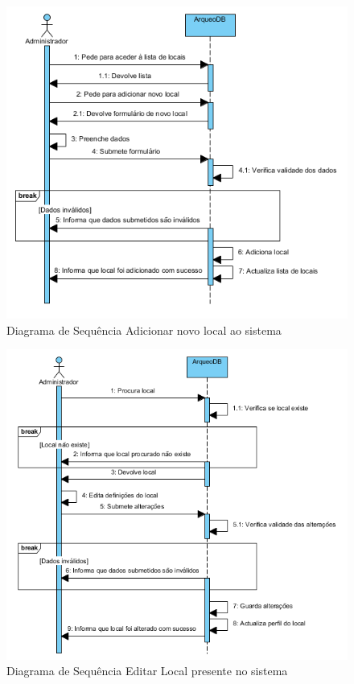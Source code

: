 \documentclass[12pt,a4paper]{article}
\begin{document}
\begin{figure}[h!]
\centering
\includegraphics[scale=1]{sequencia/A_adicionarlocal}
\caption{Diagrama de Sequência Adicionar novo local ao sistema} 
\end{figure}  

\begin{figure}[h!]
\centering
\includegraphics[scale=1]{sequencia/A_editarlocal}
\caption{Diagrama de Sequência Editar Local presente no sistema} 
\end{figure}  
\end{document}
